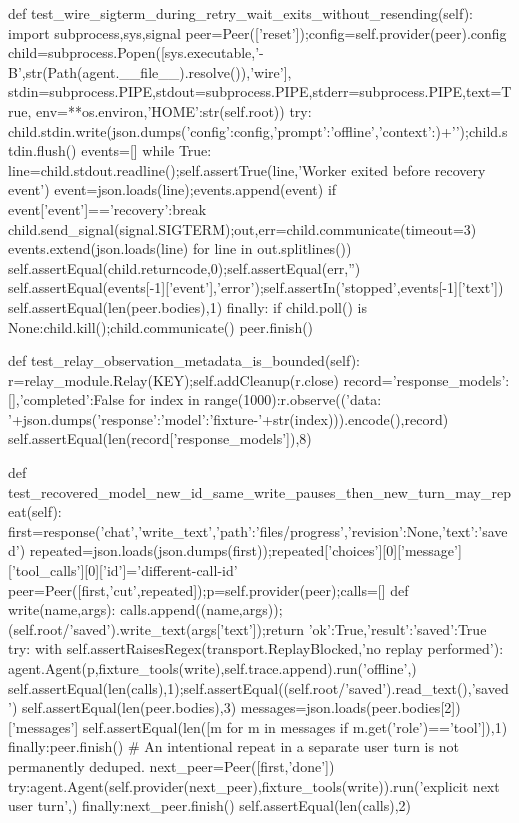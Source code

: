 {    def test_wire_sigterm_during_retry_wait_exits_without_resending(self):
        import subprocess,sys,signal
        peer=Peer(['reset']);config=self.provider(peer).config
        child=subprocess.Popen([sys.executable,'-B',str(Path(agent.__file__).resolve()),'wire'],
            stdin=subprocess.PIPE,stdout=subprocess.PIPE,stderr=subprocess.PIPE,text=True,
            env={**os.environ,'HOME':str(self.root)})
        try:
            child.stdin.write(json.dumps({'config':config,'prompt':'offline','context':{}})+'\n');child.stdin.flush()
            events=[]
            while True:
                line=child.stdout.readline();self.assertTrue(line,'Worker exited before recovery event')
                event=json.loads(line);events.append(event)
                if event['event']=='recovery':break
            child.send_signal(signal.SIGTERM);out,err=child.communicate(timeout=3)
            events.extend(json.loads(line) for line in out.splitlines())
            self.assertEqual(child.returncode,0);self.assertEqual(err,'')
            self.assertEqual(events[-1]['event'],'error');self.assertIn('stopped',events[-1]['text'])
            self.assertEqual(len(peer.bodies),1)
        finally:
            if child.poll() is None:child.kill();child.communicate()
            peer.finish()

    def test_relay_observation_metadata_is_bounded(self):
        r=relay_module.Relay(KEY);self.addCleanup(r.close)
        record={'response_models':[],'completed':False}
        for index in range(1000):r.observe(('data: '+json.dumps({'response':{'model':'fixture-'+str(index)}})).encode(),record)
        self.assertEqual(len(record['response_models']),8)


    def test_recovered_model_new_id_same_write_pauses_then_new_turn_may_repeat(self):
        first=response('chat','write_text',{'path':'files/progress','revision':None,'text':'saved'})
        repeated=json.loads(json.dumps(first));repeated['choices'][0]['message']['tool_calls'][0]['id']='different-call-id'
        peer=Peer([first,'cut',repeated]);p=self.provider(peer);calls=[]
        def write(name,args):
            calls.append((name,args));(self.root/'saved').write_text(args['text']);return {'ok':True,'result':{'saved':True}}
        try:
            with self.assertRaisesRegex(transport.ReplayBlocked,'no replay performed'):
                agent.Agent(p,fixture_tools(write),self.trace.append).run('offline',{})
            self.assertEqual(len(calls),1);self.assertEqual((self.root/'saved').read_text(),'saved')
            self.assertEqual(len(peer.bodies),3)
            messages=json.loads(peer.bodies[2])['messages']
            self.assertEqual(len([m for m in messages if m.get('role')=='tool']),1)
        finally:peer.finish()
        # An intentional repeat in a separate user turn is not permanently deduped.
        next_peer=Peer([first,'done'])
        try:agent.Agent(self.provider(next_peer),fixture_tools(write)).run('explicit next user turn',{})
        finally:next_peer.finish()
        self.assertEqual(len(calls),2)

}
